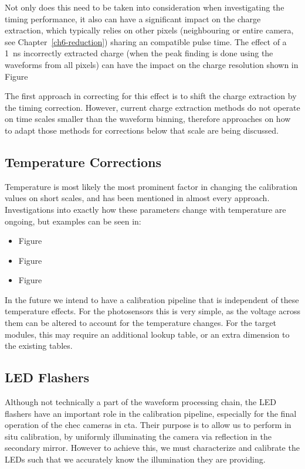 Not only does this need to be taken into consideration when investigating the timing performance, it also can have a significant impact on the charge extraction, which typically relies on other pixels (neighbouring or entire camera, see Chapter~\ref{ch6-reduction}) sharing an compatible pulse time. The effect of a 1~ns incorrectly extracted charge (when the peak finding is done using the waveforms from all pixels) can have the impact on the charge resolution shown in Figure~

The first approach in correcting for this effect is to shift the charge extraction by the timing correction. However, current charge extraction methods do not operate on time scales smaller than the waveform binning, therefore approaches on how to adapt those methods for corrections below that scale are being discussed.

\subsection{\label{temperature_corrections}Temperature Corrections}

Temperature is most likely the most prominent factor in changing the calibration values on short scales, and has been mentioned in almost every approach. Investigations into exactly how these parameters change with temperature are ongoing, but examples can be seen in:
\begin{itemize}
	\item Figure~
	\item Figure~
	\item Figure~
\end{itemize}
In the future we intend to have a calibration pipeline that is independent of these temperature effects. For the photosensors this is very simple, as the voltage across them can be altered to account for the temperature changes. For the \gls{target} modules, this may require an additional lookup table, or an extra dimension to the existing tables.

\subsection{LED Flashers}

Although not technically a part of the waveform processing chain, the LED flashers have an important role in the calibration pipeline, especially for the final operation of the \gls{chec} cameras in \gls{cta}. Their purpose is to allow us to perform in situ calibration, by uniformly illuminating the camera via reflection in the secondary mirror. However to achieve this, we must characterize and calibrate the LEDs such that we accurately know the illumination they are providing. 

